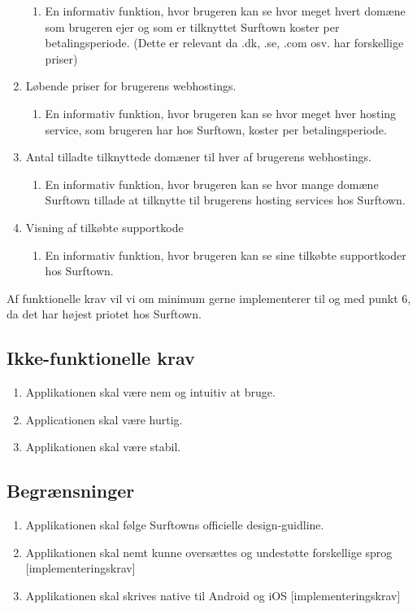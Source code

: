 \documentclass[12pt]{article}
\begin{document}
\begin{enumerate}
	\begin{enumerate}
		\item{En informativ funktion, hvor brugeren kan se hvor meget hvert domæne som brugeren ejer og som er tilknyttet Surftown koster per betalingsperiode. (Dette er relevant da .dk, .se, .com osv. har forskellige priser)}
	\end{enumerate}
  \item{Løbende priser for brugerens webhostings.}
	\begin{enumerate}
		\item{En informativ funktion, hvor brugeren kan se hvor meget hver hosting service, som brugeren har hos Surftown, koster per betalingsperiode.}
	\end{enumerate}
  \item{Antal tilladte tilknyttede domæner til hver af brugerens webhostings.}
	\begin{enumerate}
		\item{En informativ funktion, hvor brugeren kan se hvor mange domæne Surftown tillade at tilknytte til brugerens hosting services hos Surftown.}
	\end{enumerate}
  \item{Visning af tilkøbte supportkode}
	\begin{enumerate}
		\item{En informativ funktion, hvor brugeren kan se sine tilkøbte supportkoder hos Surftown.}
	\end{enumerate}
\end{enumerate}
Af funktionelle krav vil vi om minimum gerne implementerer til og med punkt 6, da det har højest priotet hos Surftown.
\subsection{Ikke-funktionelle krav}
\label{nonfunctionlist}
\begin{enumerate}
  \item{Applikationen skal være nem og intuitiv at bruge.}
  \item{Applicationen skal være hurtig.}
  \item{Applikationen skal være stabil.}
\end{enumerate}
\subsection{Begrænsninger}
\label{constrains}
\begin{enumerate}
  \item{Applikationen skal følge Surftowns officielle design-guidline.}
  \item{Applikationen skal nemt kunne oversættes og undestøtte forskellige sprog [implementeringskrav]}
  \item{Applikationen skal skrives native til Android og iOS [implementeringskrav]}
\end{enumerate}
\newpage
\end{document}
